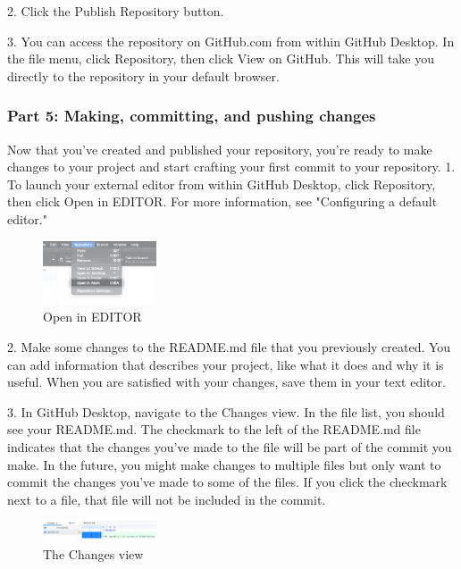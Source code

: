 2.	Click the Publish Repository button.


3.	You can access the repository on GitHub.com from within GitHub Desktop. In the file menu, click Repository, then click View on GitHub. This will take you directly to the repository in your default browser.




\subsubsection{Part 5: Making, committing, and pushing changes}
Now that you've created and published your repository, you're ready to make changes to your project and start crafting your first commit to your repository.
1.	To launch your external editor from within GitHub Desktop, click Repository, then click Open in EDITOR. For more information, see "Configuring a default editor."
\begin{figure}[ht]
    \centering
    \includegraphics[width=0.3\textwidth]{figures/Open in EDITOR.png}
    \caption{Open in EDITOR}
\end{figure}
 
2.	Make some changes to the README.md file that you previously created. You can add information that describes your project, like what it does and why it is useful. When you are satisfied with your changes, save them in your text editor.

3.	In GitHub Desktop, navigate to the Changes view. In the file list, you should see your README.md. The checkmark to the left of the README.md file indicates that the changes you've made to the file will be part of the commit you make. In the future, you might make changes to multiple files but only want to commit the changes you've made to some of the files. If you click the checkmark next to a file, that file will not be included in the commit.
\begin{figure}[ht]
    \centering
    \includegraphics[width=0.3\textwidth]{figures/The Changes view.png}
    \caption{The Changes view}
\end{figure}
 
